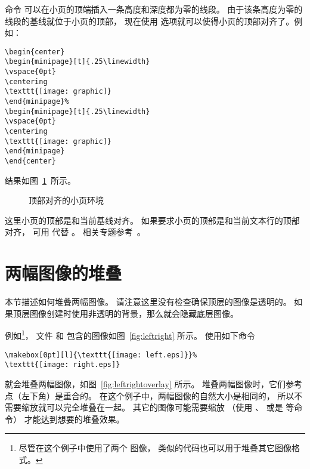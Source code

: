 命令  可以在小页的顶端插入一条高度和深度都为零的线段。
由于该条高度为零的线段的基线就位于小页的顶部，
现在使用 \opt{[t]} 选项就可以使得小页的顶部对齐了。例如：
\begin{lstlisting}
\begin{center}
\begin{minipage}[t]{.25\linewidth}
\vspace{0pt}
\centering
\texttt{[image: graphic]}
\end{minipage}%
\begin{minipage}[t]{.25\linewidth}
\vspace{0pt}
\centering
\texttt{[image: graphic]}
\end{minipage}
\end{center}
\end{lstlisting}
结果如图~\ref{fig:minipagesamp-3}~所示。
\begin{figure}
\begin{center}
	\begin{minipage}[t]{.25\linewidth}
		\vspace{0pt}
		\centering
		\resizebox{1in}{!}{\usebox{\boxgraphic}}
	\end{minipage}%
	\begin{minipage}[t]{.25\linewidth}
		\vspace{0pt}
		\centering
	\end{minipage}
\end{center}
\caption{顶部对齐的小页环境}\label{fig:minipagesamp-3}
\end{figure}

这里小页的顶部是和当前基线对齐。
如果要求小页的顶部是和当前文本行的顶部对齐，
可用  代替 。
相关专题参考~\cite[第~863--865~页]{Mittelbach2004}。


\section{两幅图像的堆叠}
本节描述如何堆叠两幅图像。
请注意这里没有检查确保顶层的图像是透明的。
如果顶层图像创建时使用非透明的背景，那么就会隐藏底层图像。

例如\footnote{
	尽管在这个例子中使用了两个  图像，
	类似的代码也可以用于堆叠其它图像格式。
}，
文件  和  包含的图像如图~\ref{fig:leftright} 所示。
使用如下命令
\begin{lstlisting}
\makebox[0pt][l]{\texttt{[image: left.eps]}}%
\texttt{[image: right.eps]}
\end{lstlisting}
就会堆叠两幅图像，如图~\ref{fig:leftrightoverlay} 所示。
堆叠两幅图像时，它们参考点（左下角）是重合的。
在这个例子中，两幅图像的自然大小是相同的，
所以不需要缩放就可以完全堆叠在一起。
其它的图像可能需要缩放
（使用 、 或是  等命令）
才能达到想要的堆叠效果。

